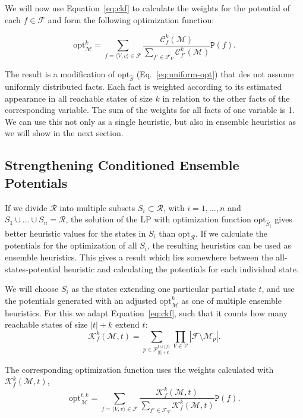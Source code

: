 We will now use Equation~\eqref{eq:ckf} to calculate the weights for the potential of each $f\in\mathcal{F}$ and form the following optimization function:

\begin{equation}
    \mathrm{opt}^k_\mathcal{M}=\sum_{f=\langle V,v \rangle\in\mathcal{F}}\frac{\mathcal{C}_f^k(\mathcal{M})}{\sum_{f'\in\mathcal{F}_V}\mathcal{C}_{f'}^k(\mathcal{M})}\mathtt{P}(f).
    \label{eq:opt1}
\end{equation}

The result is a modification of $\mathrm{opt}_{\hat{S}}$ (Eq.~\eqref{eq:uniform-opt}) that des not assume uniformly distributed facts.
Each fact is weighted according to its estimated appearance in all reachable states of size $k$ in relation to the other facts of the corresponding variable.
The sum of the weights for all facts of one variable is 1.
We can use this not only as a single heuristic, but also in ensemble heuristics as we will show in the next section.

\subsection{Strengthening Conditioned Ensemble Potentials}\label{subsec:strengthening-conditioned-ensemble}
If we divide $\mathcal{R}$ into multiple subsets $S_i\subset\mathcal{R}$, with $i=1,\dots,n$ and $S_1\cup\dots\cup S_n=\mathcal{R}$, the solution of the LP with optimization function $\mathrm{opt}_{\hat{S}_i}$ gives better heuristic values for the states in $S_i$ than $\mathrm{opt}_\mathcal{R}$.
If we calculate the potentials for the optimization of all $S_i$, the resulting heuristics can be used as ensemble heuristics.
This gives a result which lies somewhere between the all-states-potential heuristic and calculating the potentials for each individual state.

We will choose $S_i$ as the states extending one particular partial state $t$, and use the potentials generated with an adjusted $\mathrm{opt}^k_\mathcal{M}$ as one of multiple ensemble heuristics.
For this we adapt Equation~\eqref{eq:ckf}, such that it counts how many reachable states of size $|t| + k$ extend $t$:
\begin{equation}
    \mathcal{K}^k_f(\mathcal{M}, t) = \sum_{p\in\mathcal{P}^{t\cup\{f\}}_{|t|+k}}\prod_{V\in\mathcal{V}}|\mathcal{F}\setminus\mathcal{M}_p|.
\end{equation}

The corresponding optimization function uses the weights calculated with $\mathcal{K}^k_f(\mathcal{M}, t)$,
\begin{equation}
    \mathrm{opt}^{t,k}_\mathcal{M}=\sum_{f=\langle V,v \rangle\in\mathcal{F}}\frac{\mathcal{K}^k_f(\mathcal{M}, t)}{\sum_{f'\in\mathcal{F}_V}\mathcal{K}^k_f(\mathcal{M}, t)}\mathtt{P}(f).
    \label{eq:opt2}
\end{equation}

